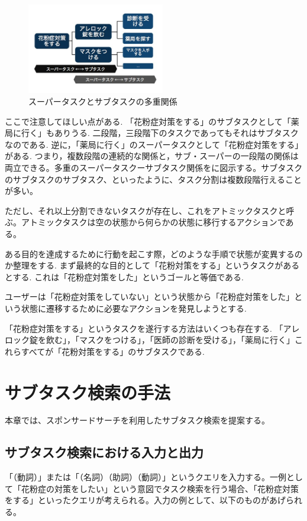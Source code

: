 \documentclass[submit,techreq]{ipsj}
\begin{document}
\begin{figure}[tb]
\includegraphics[width=6cm, bb=0 0 350 319]{super_sub_sub.jpg}
\caption{スーパータスクとサブタスクの多重関係}
\label{fig:super_sub_sub}
\end{figure}


ここで注意してほしい点がある. 「花粉症対策をする」のサブタスクとして「薬局に行く」もありうる. 二段階，三段階下のタスクであってもそれはサブタスクなのである. 逆に，「薬局に行く」のスーパータスクとして「花粉症対策をする」がある. つまり，複数段階の連続的な関係と，サブ・スーパーの一段階の関係は両立できる。多重のスーパータスクーサブタスク関係をに図示する。サブタスクのサブタスクのサブタスク、といったように、タスク分割は複数段階行えることが多い。

ただし、それ以上分割できないタスクが存在し、これをアトミックタスクと呼ぶ。アトミックタスクは空の状態から何らかの状態に移行するアクションである。


ある目的を達成するために行動を起こす際，どのような手順で状態が変異するのか整理をする. まず最終的な目的として「花粉対策をする」というタスクがあるとする. これは「花粉症対策をした」というゴールと等価である.

ユーザーは「花粉症対策をしていない」という状態から「花粉症対策をした」という状態に遷移するために必要なアクションを発見しようとする.

「花粉症対策をする」というタスクを遂行する方法はいくつも存在する. 「アレロック錠を飲む」，「マスクをつける」，「医師の診断を受ける」，「薬局に行く」これらすべてが「花粉対策をする」のサブタスクである.



\section{サブタスク検索の手法}
本章では、スポンサードサーチを利用したサブタスク検索を提案する。

\subsection{サブタスク検索における入力と出力}
「（動詞）」または「（名詞）（助詞）（動詞）」というクエリを入力する。一例として「花粉症の対策をしたい」という意図でタスク検索を行う場合、「花粉症対策をする」といったクエリが考えられる。入力の例として、以下のものがあげられる。
\end{document}
